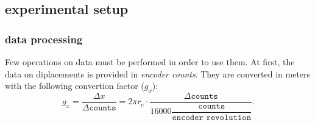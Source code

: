 \documentclass[twosided,a4paper]{article}           %
\begin{document}
\subsection{experimental setup}
\subsubsection{data processing}
Few operations on data must be performed in order to use them. At first, the data on diplacements is provided in \textit{encoder counts}. They are converted in meters with the following convertion factor ($g_x$):
\begin{equation}
	g_x = \dfrac{\Delta x}{\Delta \texttt{counts}} = 2 \pi r_e \cdot \dfrac{\Delta \texttt{counts}}{16000\dfrac{\texttt{counts}}{\texttt{encoder revolution}}}.
\end{equation}
\end{document}
